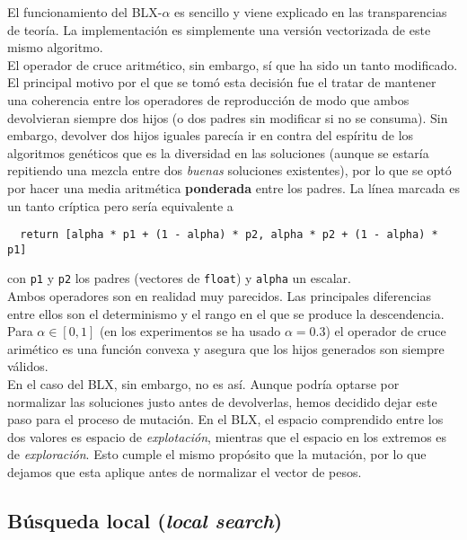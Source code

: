 \documentclass[11pt]{article}
\theoremstyle{plain}
\theoremstyle{definition}
\begin{document}
El funcionamiento del BLX-$\alpha$ es sencillo y viene explicado en
las transparencias de teoría. La implementación es simplemente una
versión vectorizada de este mismo algoritmo. \\

El operador de cruce aritmético, sin embargo, sí que ha sido un tanto
modificado. El principal motivo por el que se tomó esta decisión fue
el tratar de mantener una coherencia entre los operadores de
reproducción de modo que ambos devolvieran siempre dos hijos (o dos
padres sin modificar si no se consuma). Sin embargo, devolver dos
hijos iguales parecía ir en contra del espíritu de los algoritmos
genéticos que es la diversidad en las soluciones (aunque se estaría
repitiendo una mezcla entre dos \textit{buenas} soluciones
existentes), por lo que se optó por hacer una media aritmética
\textbf{ponderada} entre los padres. La línea marcada es un tanto
críptica pero sería equivalente a

\begin{lstlisting}
  return [alpha * p1 + (1 - alpha) * p2, alpha * p2 + (1 - alpha) * p1]
\end{lstlisting}

con \texttt{p1} y \texttt{p2} los padres (vectores de \texttt{float}) y \texttt{alpha} un escalar. \\

Ambos operadores son en
realidad muy parecidos. Las principales diferencias entre ellos son el
determinismo y el rango en el que se produce la descendencia. Para
$\alpha \in [0, 1]$ (en los experimentos se ha usado $\alpha = 0.3$)
el operador de cruce arimético es una función convexa y asegura que
los hijos generados son siempre válidos. \\

En el caso del BLX, sin
embargo, no es así. Aunque podría optarse por normalizar las
soluciones justo antes de devolverlas, hemos decidido dejar este paso
para el proceso de mutación. En el BLX, el espacio comprendido entre
los dos valores es espacio de \textit{explotación}, mientras que el
espacio en los extremos es de \textit{exploración}. Esto
cumple el mismo propósito que la mutación, por lo que dejamos que esta
aplique antes de normalizar el vector de pesos.

\subsection{Búsqueda local (\textit{local search})}
\end{document}
